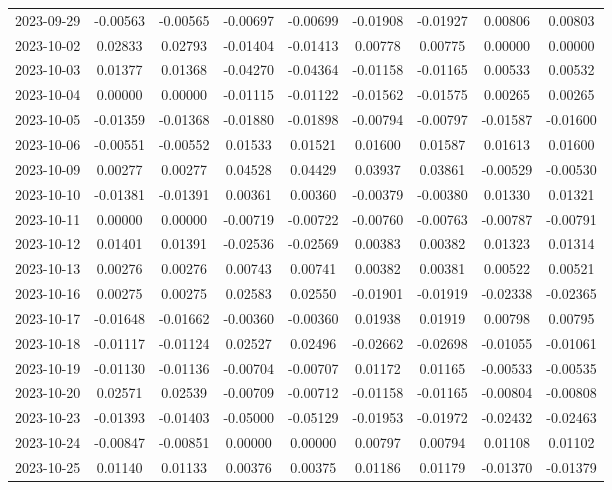 \begin{footnotesize}
\begin{longtable}{lcccccccc}
2023-09-29 & -0.00563 & -0.00565 & -0.00697 & -0.00699 & -0.01908 & -0.01927 & 0.00806 & 0.00803 \\
2023-10-02 & 0.02833 & 0.02793 & -0.01404 & -0.01413 & 0.00778 & 0.00775 & 0.00000 & 0.00000 \\
2023-10-03 & 0.01377 & 0.01368 & -0.04270 & -0.04364 & -0.01158 & -0.01165 & 0.00533 & 0.00532 \\
2023-10-04 & 0.00000 & 0.00000 & -0.01115 & -0.01122 & -0.01562 & -0.01575 & 0.00265 & 0.00265 \\
2023-10-05 & -0.01359 & -0.01368 & -0.01880 & -0.01898 & -0.00794 & -0.00797 & -0.01587 & -0.01600 \\
2023-10-06 & -0.00551 & -0.00552 & 0.01533 & 0.01521 & 0.01600 & 0.01587 & 0.01613 & 0.01600 \\
2023-10-09 & 0.00277 & 0.00277 & 0.04528 & 0.04429 & 0.03937 & 0.03861 & -0.00529 & -0.00530 \\
2023-10-10 & -0.01381 & -0.01391 & 0.00361 & 0.00360 & -0.00379 & -0.00380 & 0.01330 & 0.01321 \\
2023-10-11 & 0.00000 & 0.00000 & -0.00719 & -0.00722 & -0.00760 & -0.00763 & -0.00787 & -0.00791 \\
2023-10-12 & 0.01401 & 0.01391 & -0.02536 & -0.02569 & 0.00383 & 0.00382 & 0.01323 & 0.01314 \\
2023-10-13 & 0.00276 & 0.00276 & 0.00743 & 0.00741 & 0.00382 & 0.00381 & 0.00522 & 0.00521 \\
2023-10-16 & 0.00275 & 0.00275 & 0.02583 & 0.02550 & -0.01901 & -0.01919 & -0.02338 & -0.02365 \\
2023-10-17 & -0.01648 & -0.01662 & -0.00360 & -0.00360 & 0.01938 & 0.01919 & 0.00798 & 0.00795 \\
2023-10-18 & -0.01117 & -0.01124 & 0.02527 & 0.02496 & -0.02662 & -0.02698 & -0.01055 & -0.01061 \\
2023-10-19 & -0.01130 & -0.01136 & -0.00704 & -0.00707 & 0.01172 & 0.01165 & -0.00533 & -0.00535 \\
2023-10-20 & 0.02571 & 0.02539 & -0.00709 & -0.00712 & -0.01158 & -0.01165 & -0.00804 & -0.00808 \\
2023-10-23 & -0.01393 & -0.01403 & -0.05000 & -0.05129 & -0.01953 & -0.01972 & -0.02432 & -0.02463 \\
2023-10-24 & -0.00847 & -0.00851 & 0.00000 & 0.00000 & 0.00797 & 0.00794 & 0.01108 & 0.01102 \\
2023-10-25 & 0.01140 & 0.01133 & 0.00376 & 0.00375 & 0.01186 & 0.01179 & -0.01370 & -0.01379 \\

\end{longtable}
\end{footnotesize}
